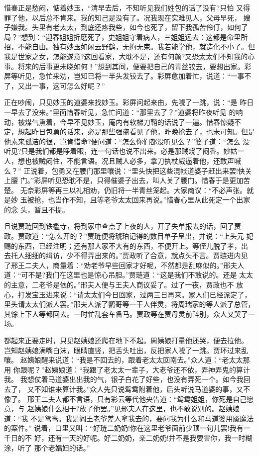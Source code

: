 惜春正是愁闷，惦着妙玉，“清早去后，不知听见我们姓包的话了没有?只怕
又得罪了他，以后总不肯来。我的知己是没有了。况我现在实难见人，父母早死，
嫂子嫌我。头里有老太太，到底还疼我些，如今也死了，留下我孤苦伶仃，如何了
局？”想到：“迎春姐姐折磨死了，史姐姐守着病人，三姐姐远去：这都是命里所
招，不能自由。独有妙玉如闲云野鹤，无拘无束。我若能学他，就造化不小了。但
我是世家之女，怎能遂意?这回看家，大耽不是，还有何颜?又恐太太们不知我的心
事。将来的后事更未晓如何！”想到其间，便要把自己的青丝铰去，要想出家。彩
屏等听见，急忙来劝，岂知已将一半头发铰去了。彩屏愈加着忙，说道：“一事不
了，又出一事，这可怎么好呢？”

正在吵闹，只见妙玉的道婆来找妙玉。彩屏问起来由，先唬了一跳，说：“是
昨日一早去了没来。”里面惜春听见，急忙问道：“那里去了？”道婆将昨夜听见
的响动，被煤气熏着，今早不见妙玉，庵内有软梯刀鞘的话说了一遍。惜春惊疑不
定，想起昨日包勇的话来，必是那些强盗看见了他，昨晚抢去了，也未可知。但是
他素来孤洁的很，岂肯惜命?便问道：“怎么你们都没听见么？”婆子道：“怎么
没听见?只是我们都是睁着眼，连一句话也说不出来。必是那贼烧了闷香。妙姑一
人，想也被贼闷住，不能言语。况且贼人必多，拿刀执杖威逼着他，还敢声喊么？”
正说着，包勇又在腰门那里嚷说：“里头快把这些混帐道婆子赶出来罢!快关上腰
门。”彩屏听见恐耽不是，只得催婆子出去，叫人关了腰门。惜春于是更加苦楚。
无奈彩屏等再三以礼相劝，仍旧将一半青丝笼起。大家商议：“不必声张。就是妙
玉被抢，也当作不知，且等老爷太太回来再说。”惜春心里从此死定一个出家的念
头，暂且不提。

且说贾琏回到铁槛寺，将到家中查点了上夜的人，开了失单报去的话，回了贾
政。贾政道：“怎么开的？”贾琏便将琥珀记得的数目单子呈出，并说：“上头元
妃赐的东西，已经注明；还有那人家不大有的东西，不便开上。等侄儿脱了孝，出
去托人细细的缉访，少不得弄出来的。”贾政听了合意，就点头不言。贾琏进内见
了邢王二夫人，商量着：“劝老爷早些回家才好呢，不然都是乱麻似的。”邢夫人
道：“可不是?我们在这里也是惊心吊胆。”贾琏道：“这是我们不敢说的。还是
太太的主意，二老爷是依的。”邢夫人便与王夫人商议妥了。过了一夜，贾政也不
放心，打发宝玉进来说：“请太太们今日回家，过两三日再来。家人们已经派定了，
里头请太太们派人罢。”邢夫人派了鹦哥等一干人伴灵，将周瑞家的等人派了总管，
其馀上下人等都回去。一时忙乱套车备马。贾政等在贾母灵前辞别，众人又哭了一
场。

都起来正要走时，只见赵姨娘还爬在地下不起。周姨娘打量他还哭，便去拉他。
岂知赵姨娘满嘴白沫，眼睛直竖，把舌头吐出，反把家人唬了一跳。贾环过来乱嚷。
赵姨娘醒来说道：“我是不回去的，跟着老太太回南去。”众人道：“老太太那用
你跟呢？”赵姨娘道：“我跟了老太太一辈子，大老爷还不依，弄神弄鬼的算计我。
我想仗着马道婆出出我的气，银子白花了好些，也没有弄死一个。如今我回去了，
又不知谁来算计我。”众人先只说鸳鸯附着他，后头听说马道婆的事，又不像了。
邢王二夫人都不言语，只有彩云等代他央告道：“鸳鸯姐姐，你死是自己愿意，与
赵姨娘什么相干?放了他罢。”见邢夫人在这里，也不敢说别的。赵姨娘道：“我
不是鸳鸯。我是阎王老爷差人拿我去的，要问我为什么和马道婆用魇魔法的案件。”
说着，口里又叫：“好琏二奶奶!你在这里老爷面前少顶一句儿罢!我有一千日的不
好，还有一天的好呢。好二奶奶，亲二奶奶!并不是我要害你，我一时糊涂，听了
那个老娼妇的话。”

